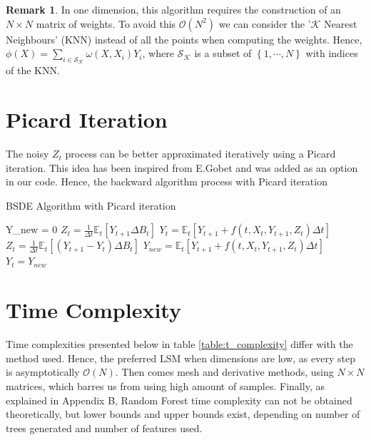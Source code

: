 \documentclass[english,11pt,openany]{report}
\theoremstyle{definition}
\newcommand{\bigO}{\mathcal{O}}
\theoremstyle{plain}
\theoremstyle{definition}
\newtheorem{Rem}[Th]{Remark}
\begin{document}
\begin{Rem}
	In one dimension, this algorithm requires the construction of an $N \times N$ matrix of weights. To avoid this $\bigO(N^2)$ we can consider the '$\mathcal{K}$ Nearest Neighbours' (KNN) instead of all the points when computing the weights. 
	Hence, $\phi(X) = \sum_{i \in \mathcal{S}_{\mathcal{K}}} \omega(X, X_i)Y_i $, where $\mathcal{S}_{\mathcal{K}}$ is a subset of $\left\lbrace 1, \cdots, N \right\rbrace$ with indices of the KNN.
\end{Rem}


\section{Picard Iteration}

The noisy $Z_t$ process can be better approximated iteratively using a Picard iteration. This idea has been inspired from E.Gobet \cite{gobet:picard} and was added as an option in our code. 
Hence, the backward algorithm process with Picard iteration 
	
	
\begin{algorithm}
	\caption{BSDE Algorithm with Picard iteration}
	\label{algo:picard}
	\begin{algorithmic}[1]
		\State Y\_new = 0
		\State $Z_t =\frac{1}{\Delta t}\mathbb{E}_t[Y_{t + 1} \Delta B_t]$ 
		\State $Y_t = \mathbb{E}_t[Y_{t+1} +  f(t,X_t, Y_{t+1}, Z_t)\Delta t]$
		\State  $Z_t =\frac{1}{\Delta t}\mathbb{E}_t[(Y_{t + 1} - Y_t)\Delta B_t]$
		\State  $Y_{new} = \mathbb{E}_t[Y_{t+1} +  f(t,X_t, Y_{t+1}, Z_t)\Delta t]$
		\State  $Y_t = Y_{new}$
		\EndFor
		\EndFor
		\EndProcedure
	\end{algorithmic}
\end{algorithm}
	
\section{Time Complexity}		
	
	Time complexities presented below in table \ref{table:t_complexity} differ with the method used. 
	Hence, the preferred LSM when dimensions are low, as every step is asymptotically $\bigO(N)$.
	Then comes mesh and derivative methods, using $N\times N$ matrices, which barres us from using high amount of samples. 
	Finally, as explained in Appendix B, Random Forest time complexity can not be obtained theoretically, but lower bounds and upper bounds exist, depending on number of trees generated and number of features used. 
	
\end{document}
